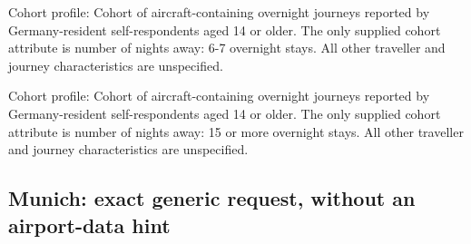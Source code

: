 \begin{promptbox}[title={Number of nights away: 6-7 overnight stays}]
Cohort profile: Cohort of aircraft-containing overnight journeys reported by Germany-resident self-respondents aged 14 or older. The only supplied cohort attribute is number of nights away: 6-7 overnight stays. All other traveller and journey characteristics are unspecified.
\end{promptbox}


\begin{promptbox}[title={Number of nights away: 15 or more overnight stays}]
Cohort profile: Cohort of aircraft-containing overnight journeys reported by Germany-resident self-respondents aged 14 or older. The only supplied cohort attribute is number of nights away: 15 or more overnight stays. All other traveller and journey characteristics are unspecified.
\end{promptbox}


\subsection{Munich: exact generic request, without an airport-data hint}

